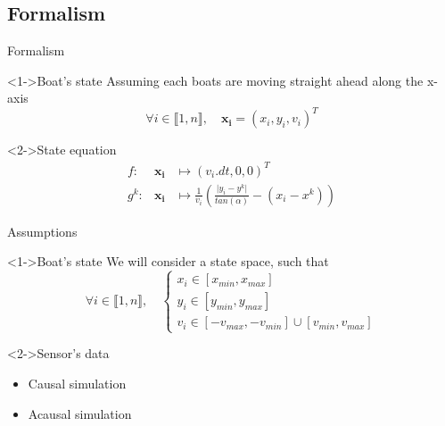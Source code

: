 \documentclass{beamer}
\begin{document}
        \subsection{Formalism}

            \begin{frame}{Formalism}
                \begin{block}<1->{Boat's state}
                    Assuming each boats are moving straight ahead along the x-axis
                    $$\forall i \in \llbracket 1, n\rrbracket, \quad \mathbf{x_i} = (x_i, y_i, v_i)^T$$ 
                \end{block}

                \begin{block}<2->{State equation}
                    \begin{eqnarray}
                        f:& \mathbf{x_i} &\mapsto (v_i.dt, 0, 0)^T \\
                        g^k:& \mathbf{x_i}  &\mapsto \frac{1}{v_i} \left(\frac{\lvert y_i - y^k \rvert}{tan(\alpha)} - (x_i - x^k)\right)
                    \end{eqnarray}
                \end{block}
            \end{frame}

            \begin{frame}{Assumptions}
                \begin{block}<1->{Boat's state}
                    We will consider a state space, such that
                    \begin{equation}
                        \forall i \in \llbracket 1, n\rrbracket, \quad \begin{cases}x_i \in [x_{min}, x_{max}] \\ y_i \in [y_{min}, y_{max}] \\ v_i \in [-v_{max}, -v_{min}] \cup [v_{min}, v_{max}] \end{cases}
                    \end{equation}
                \end{block}
                \begin{block}<2->{Sensor's data}
                    \begin{itemize}
                        \item Causal simulation
                        \item Acausal simulation
                    \end{itemize}
                \end{block}
            \end{frame}
        
\end{document}
